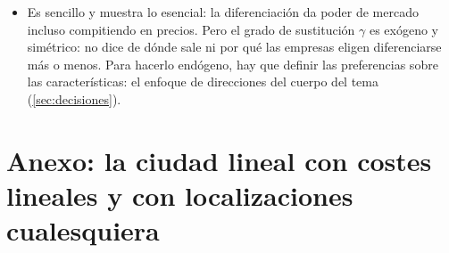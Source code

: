\documentclass[11pt]{article}
\begin{document}
\begin{itemize}
\item Es sencillo y muestra lo esencial: la diferenciación da poder de mercado incluso compitiendo en precios. Pero el grado de sustitución $\gamma$ es exógeno y simétrico: no dice de dónde sale ni por qué las empresas eligen diferenciarse más o menos. Para hacerlo endógeno, hay que definir las preferencias sobre las características: el enfoque de direcciones del cuerpo del tema (\ref{sec:decisiones}).
\end{itemize}

\section{Anexo: la ciudad lineal con costes lineales\cortetitulo{} y con localizaciones cualesquiera}\label{anexo:hotelling}
\end{document}
